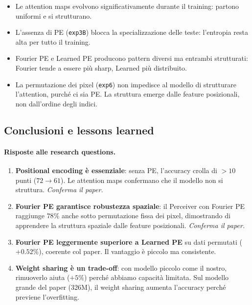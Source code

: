 \documentclass[
  11pt,
]{article}
\begin{document}
\begin{notabox}[title={\textbf{Conclusioni dall'analisi attention}}]
\begin{itemize}
\item Le attention maps evolvono significativamente durante il training: partono uniformi e si strutturano.
\item L'assenza di PE (\texttt{exp3B}) blocca la specializzazione delle teste: l'entropia resta alta per tutto il training.
\item Fourier PE e Learned PE producono pattern diversi ma entrambi strutturati: Fourier tende a essere più sharp, Learned più distribuito.
\item La permutazione dei pixel (\texttt{exp6}) non impedisce al modello di strutturare l'attention, purché ci sia PE. La struttura emerge dalle feature posizionali, non dall'ordine degli indici.
\end{itemize}
\end{notabox}

\subsection{Conclusioni e lessons learned}
\label{sec:progetto-conclusioni}

\paragraph{Risposte alle research questions.}
\begin{enumerate}
\item \textbf{Positional encoding è essenziale}: senza PE, l'accuracy crolla di $>10$ punti ($72 \to 61$). Le attention maps confermano che il modello non si struttura. \emph{Conferma il paper.}
\item \textbf{Fourier PE garantisce robustezza spaziale}: il Perceiver con Fourier PE raggiunge $78\%$ anche sotto permutazione fissa dei pixel, dimostrando di apprendere la struttura spaziale dalle feature posizionali. \emph{Conferma il paper.}
\item \textbf{Fourier PE leggermente superiore a Learned PE} su dati permutati ($+0.52\%$), coerente col paper. Il vantaggio è piccolo ma consistente.
\item \textbf{Weight sharing è un trade-off}: con modello piccolo come il nostro, rimuoverlo aiuta ($+5\%$) perché abbiamo capacità limitata. Sul modello grande del paper (326M), il weight sharing aumenta l'accuracy perché previene l'overfitting.
\end{enumerate}
\end{document}

